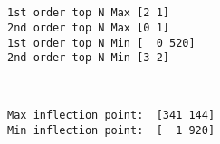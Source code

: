 \documentclass[11pt]{article}
\begin{document}
    \begin{center}
    \end{center}
    { \hspace*{\fill} \\}
    
    \begin{center}
    \end{center}
    { \hspace*{\fill} \\}
    
    \begin{Verbatim}[commandchars=\\\{\}]
1st order top N Max [2 1]
2nd order top N Max [0 1]
1st order top N Min [  0 520]
2nd order top N Min [3 2]

    \end{Verbatim}

    \begin{center}
    \end{center}
    { \hspace*{\fill} \\}
    
    \begin{Verbatim}[commandchars=\\\{\}]
Max inflection point:  [341 144]
Min inflection point:  [  1 920]

    \end{Verbatim}

    \begin{center}
    \end{center}
    { \hspace*{\fill} \\}
    
    \begin{center}
    \end{center}
    { \hspace*{\fill} \\}
    
    \begin{center}
    \end{center}
    { \hspace*{\fill} \\}
    
\end{document}
